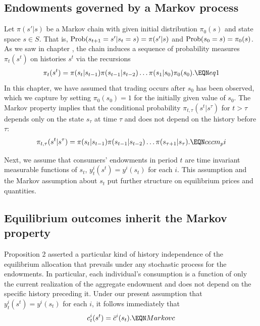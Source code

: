 \subsection{Endowments governed by a Markov process}
Let $\pi(s'|s)$ be a Markov chain with given initial distribution
$\pi_0(s)$ and state space $s\in S$.   That is, ${\rm
Prob}(s_{t+1}  = s' \vert
 s_t = s) =\pi(s'|s)$ and ${\rm Prob}  (s_0 = s) = \pi_0(s)$.
As we saw in chapter ,
 the chain induces a sequence of probability
measures $\pi_t(s^t)$  on histories $s^t$
via the recursions
$$ \pi_t(s^t) = \pi(s_t | s_{t-1}) \pi(s_{t-1} | s_{t-2}) \ldots
       \pi(s_1 | s_0)   \pi_0(s_0) . \EQN eq1  $$
In this chapter, we have assumed that trading occurs after $s_0$ has been observed,
which we capture by setting $\pi_0(s_0)=1$ for the initially
given value of $s_0$.
The Markov property implies that the conditional probability
$\pi_{t,\tau}(s^t\vert s^\tau)$ for $t>\tau$ depends only on the state
$s_\tau$ at time $\tau$ and does not depend on the history
before $\tau$:
$$\pi_{t,\tau}(s^t|s^\tau) = \pi(s_t\vert s_{t-1}) \pi(s_{t-1} \vert s_{t-2})
          \ldots\pi(s_{\tau+1} \vert s_\tau).\EQN cecm_pi$$


Next, we assume that consumers' endowments in period $t$ are
time invariant measurable functions of $s_t$,
$y^i_t(s^t)=y^i(s_t)$ for each $i$. %
This assumption and  the Markov assumption about  $s_t$ put
 further structure on  equilibrium prices and quantities.


\subsection{Equilibrium outcomes inherit the Markov property}
Proposition 2  asserted a particular kind of history independence
of the equilibrium allocation that prevails under any
stochastic process for the endowments. In particular, each
individual's consumption is  a function  of only the current
realization of the aggregate endowment and does not depend on the
specific history preceding it. Under %
our present assumption that $y_t^i(s^t)= y^i(s_t)$ for each $i$, it follows immediately that
$$
c^i_t(s^t) = \bar c^i(s_t).     \EQN Markovc
$$

